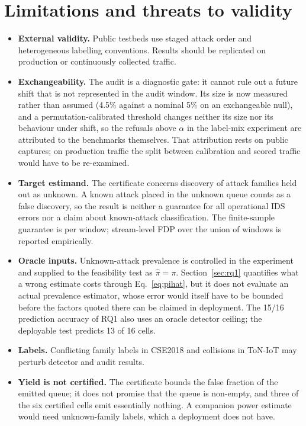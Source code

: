\documentclass[a4paper,fleqn]{cas-dc}
\begin{document}
\section{Limitations and threats to validity}
\label{sec:limitations}
\begin{itemize}
  \item \textbf{External validity.} Public testbeds use staged attack order and heterogeneous labelling conventions. Results should be replicated on production or continuously collected traffic.
  \item \textbf{Exchangeability.} The audit is a diagnostic gate: it cannot rule out a future shift that is not represented in the audit window. Its size is now measured rather than assumed (4.5\% against a nominal 5\% on an exchangeable null), and a permutation-calibrated threshold changes neither its size nor its behaviour under shift, so the refusals above $\alpha$ in the label-mix experiment are attributed to the benchmarks themselves. That attribution rests on public captures; on production traffic the split between calibration and scored traffic would have to be re-examined.
  \item \textbf{Target estimand.} The certificate concerns discovery of attack families held out as unknown. A known attack placed in the unknown queue counts as a false discovery, so the result is neither a guarantee for all operational IDS errors nor a claim about known-attack classification. The finite-sample guarantee is per window; stream-level FDP over the union of windows is reported empirically.
  \item \textbf{Oracle inputs.} Unknown-attack prevalence is controlled in the experiment and supplied to the feasibility test as $\hat\pi=\pi$. Section~\ref{sec:rq1} quantifies what a wrong estimate costs through Eq.~\eqref{eq:pihat}, but it does not evaluate an actual prevalence estimator, whose error would itself have to be bounded before the factors quoted there can be claimed in deployment. The 15/16 prediction accuracy of RQ1 also uses an oracle detector ceiling; the deployable test predicts 13 of 16 cells.
  \item \textbf{Labels.} Conflicting family labels in CSE2018 and collisions in ToN-IoT may perturb detector and audit results.
  \item \textbf{Yield is not certified.} The certificate bounds the false fraction of the emitted queue; it does not promise that the queue is non-empty, and three of the six certified cells emit essentially nothing. A companion power estimate would need unknown-family labels, which a deployment does not have.

\end{itemize}
\end{document}
